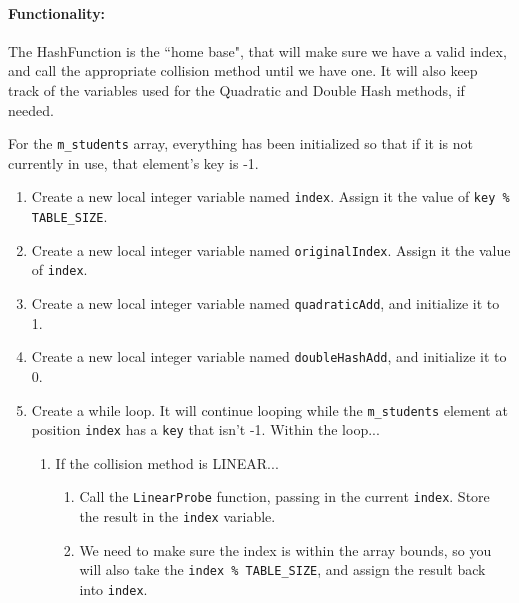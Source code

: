 \documentclass[a4paper,12pt,oneside]{book}
\begin{document}
\paragraph{Functionality:}

The HashFunction is the ``home base", that will make sure we have a valid
index, and call the appropriate collision method until we have one.
It will also keep track of the variables used for the Quadratic and Double Hash methods,
if needed.

For the \texttt{m\_students} array, everything has been initialized so that
if it is not currently in use, that element's key is -1.

\begin{enumerate}
    \item   Create a new local integer variable named \texttt{index}.
        Assign it the value of \texttt{key \% TABLE\_SIZE}.
    \item   Create a new local integer variable named \texttt{originalIndex}.
        Assign it the value of \texttt{index}.

    \item   Create a new local integer variable named \texttt{quadraticAdd},
        and initialize it to 1.
    \item   Create a new local integer variable named \texttt{doubleHashAdd},
        and initialize it to 0.

    \item   Create a while loop. It will continue looping while the
        \texttt{m\_students} element at position \texttt{index} has a
        \texttt{key} that isn't -1. Within the loop...
    \begin{enumerate}
        \item   If the collision method is LINEAR...
            \begin{enumerate}
                \item   Call the \texttt{LinearProbe} function,
                    passing in the current \texttt{index}. Store the
                    result in the \texttt{index} variable.
                \item   We need to make sure the index is within the array
                    bounds, so you will also take the \texttt{index \% TABLE\_SIZE},
                    and assign the result back into \texttt{index}.
            \end{enumerate}
            

\end{enumerate}
\end{enumerate}
\end{document}
